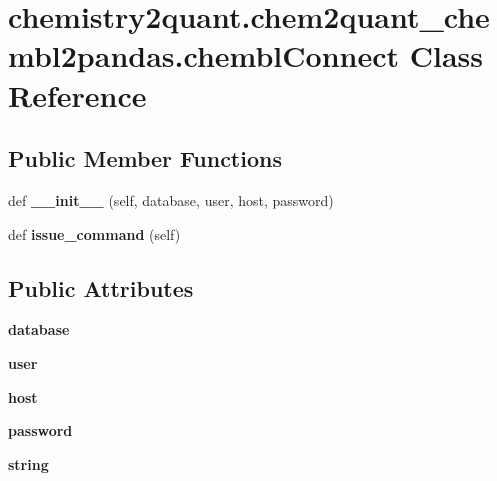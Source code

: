 \hypertarget{classchemistry2quant_1_1chem2quant__chembl2pandas_1_1chemblConnect}{}\section{chemistry2quant.\+chem2quant\+\_\+chembl2pandas.\+chembl\+Connect Class Reference}
\label{classchemistry2quant_1_1chem2quant__chembl2pandas_1_1chemblConnect}
\subsection*{Public Member Functions}
\begin{DoxyCompactItemize}
\item
\mbox{\label{classchemistry2quant_1_1chem2quant__chembl2pandas_1_1chemblConnect_a46fd7779aad1ee0b8c4a31d3990eaf32}}
def {\bfseries \+\_\+\+\_\+init\+\_\+\+\_\+} (self, database, user, host, password)
\item
\mbox{\label{classchemistry2quant_1_1chem2quant__chembl2pandas_1_1chemblConnect_aac437bf7e56eae5d3d2ed990f669c195}}
def {\bfseries issue\+\_\+command} (self)
\end{DoxyCompactItemize}
\subsection*{Public Attributes}
\begin{DoxyCompactItemize}
\item
\mbox{\label{classchemistry2quant_1_1chem2quant__chembl2pandas_1_1chemblConnect_a7366b1ab44fca2518f70d63b5612b2f9}}
{\bfseries database}
\item
\mbox{\label{classchemistry2quant_1_1chem2quant__chembl2pandas_1_1chemblConnect_a5a15ec80604b37f133f41fd2ffd7eb81}}
{\bfseries user}
\item
\mbox{\label{classchemistry2quant_1_1chem2quant__chembl2pandas_1_1chemblConnect_ab9e42b86551f6f47d9946c6509f6296b}}
{\bfseries host}
\item
\mbox{\label{classchemistry2quant_1_1chem2quant__chembl2pandas_1_1chemblConnect_a3d8385099e5c6574f7b9da4befc8f659}}
{\bfseries password}
\item
\mbox{\label{classchemistry2quant_1_1chem2quant__chembl2pandas_1_1chemblConnect_a737c0c2ca11272795261f099ef2e6b1d}}
{\bfseries string}
\end{DoxyCompactItemize}

